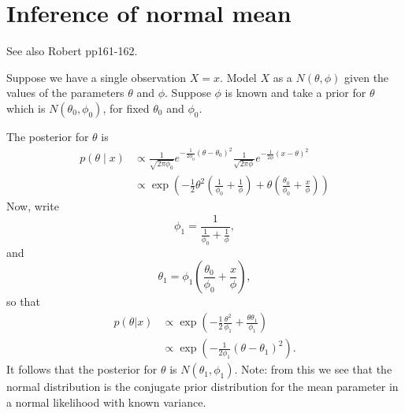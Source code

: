 \documentclass{article}[11pt]
\begin{document}
\section{Inference of normal mean}

See also Robert pp161-162.

Suppose we have a single observation $X=x$.  Model $X$ as a $N(\theta,\phi)$
given the values of the parameters $\theta$ and $\phi$.  Suppose
$\phi$ is known and take a prior for $\theta$ which is
$N(\theta_0,\phi_0)$, for fixed $\theta_0$ and
$\phi_0$. 

The posterior for $\theta$ is
\begin{align}
p(\theta \mid x) & \propto \frac{1}{\sqrt{2\pi
    \phi_0}}e^{-\frac{1}{2\phi_0}(\theta-\theta_0)^2}
\frac{1}{\sqrt{2\pi \phi}}e^{-\frac{1}{2\phi}(x-\theta)^2}
\\
& \propto \exp\left( -\frac{1}{2} \theta^2 (\frac{1}{\phi_0}+\frac{1}{\phi})+ \theta
  \left( \frac{\theta_0}{\phi_0}+\frac{x}{\phi} \right) \right)
  \end{align}
Now, write
\begin{equation}
\phi_1=\frac{1}{\frac{1}{\phi_0}+\frac{1}{\phi}},
\end{equation}
and
\begin{equation}
\theta_1=\phi_1 \left( \frac{\theta_0}{\phi_0}+\frac{x}{\phi}
\right),
\end{equation}
so that
\begin{align}
p(\theta | x) & \propto \exp\left( -\frac{1}{2}
  \frac{\theta^2}{\phi_1} + \frac{\theta \theta_1}{\phi_1} \right) \\
  & \propto \exp\left( -\frac{1}{2\phi_1} (\theta-\theta_1)^2 \right).
  \end{align}
It follows that the posterior for $\theta$ is $N(\theta_1,\phi_1)$. Note: from this we see that the normal distribution is the conjugate prior distribution for the mean parameter in a normal likelihood with known variance.
\end{document}
